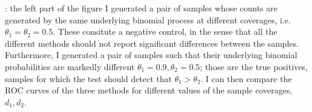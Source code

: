 \documentclass[11pt]{amsart}
\begin{document}
: the left part of the figure  
I generated a pair of samples whose counts are generated by the same underlying binomial process at different coverages, i.e. $\theta_1=\theta_2=0.5$. These consitute a negative control, in the sense that all the different methods should not report significant differences between the samples. Furthermore, I generated a pair of samples such that their underlying binomial probabilities are markedly different $\theta_1=0.9,\theta_2=0.5$; those are the true positives, samples for which the test should detect that $\theta_1>\theta_2$. I can then compare the ROC curves of the three methods for different values of the sample coverages, $d_1,d_2$. 
\end{document}
